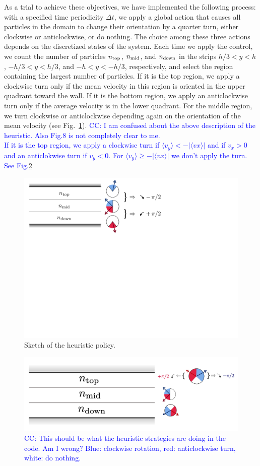 \documentclass[aps,prl,twocolumn,amsmath,amssymb,superscriptaddress]{revtex4-1}
\newcommand{\CC}[1]
{\textcolor{blue}{#1}}
\begin{document}
As a trial to achieve these objectives, we have implemented the following process: with a specified time periodicity $\Delta t$, we apply a global action that causes all particles in the domain to change their orientation by a quarter turn, either clockwise or anticlockwise, or do nothing. The choice among these three actions depends on the discretized states of the system. Each time we apply the control, we count the number of particles $n_{\rm top}$, $n_{\rm mid}$, and $n_{\rm down}$ in the strips $h/3 < y < h$, $-h/3 < y < h/3$, and $-h < y < -h/3$, respectively, and select the region containing the largest number of particles. If it is the top region, we apply a clockwise turn only if the mean velocity in this region is oriented in the upper quadrant toward the wall. If it is the bottom region, we apply an anticlockwise turn only if the average velocity is in the lower quadrant. For the middle region, we turn clockwise or anticlockwise depending again on the orientation of the mean velocity (see Fig.~\ref{fig:sketch_heuristics}). \CC{CC: I am confused about the above description of the heuristic. Also Fig.8 is not completely clear to me.
\\
If it is the top region, we apply a clockwise turn if $\langle v_y\rangle < -|\langle vx \rangle|$ and if $v_x>0$ and an anticlokwise turn if $v_y<0$. For $\langle v_y\rangle \geq -|\langle vx \rangle|$ we don't apply the turn. See Fig.\ref{fig:Fig8_Chiara}}
\begin{figure}[t!]
    \includegraphics[width=0.8\linewidth]{sketch_heuristics}
    \caption{\label{fig:sketch_heuristics} Sketch of the heuristic policy.}
\end{figure}

\begin{figure}[t!]
\includegraphics[width=01\linewidth]{figs/Fig8_Chiara.png}
    \caption{ \CC{CC: This should be what the heuristic strategies are doing in the code. Am I wrong? Blue: clockwise rotation, red: anticlockwise turn, white: do nothing.}\label{fig:Fig8_Chiara}}
\end{figure}
\end{document}
